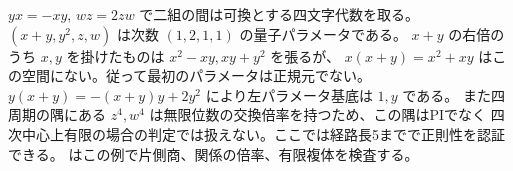 \begin{remark}
$yx=-xy$, $wz=2zw$ で二組の間は可換とする四文字代数を取る。
$(x+y,y^2,z,w)$ は次数 $(1,2,1,1)$ の量子パラメータである。
$x+y$ の右倍のうち $x,y$ を掛けたものは $x^2-xy,xy+y^2$ を張るが、
$x(x+y)=x^2+xy$ はこの空間にない。従って最初のパラメータは正規元でない。
$y(x+y)=-(x+y)y+2y^2$ により左パラメータ基底は $1,y$ である。
また四周期の隅にある $z^4,w^4$ は無限位数の交換倍率を持つため、この隅はPIでなく
四次中心上有限の場合の判定では扱えない。ここでは経路長5までで正則性を認証できる。
 はこの例で片側商、関係の倍率、有限複体を検査する。
\end{remark}
